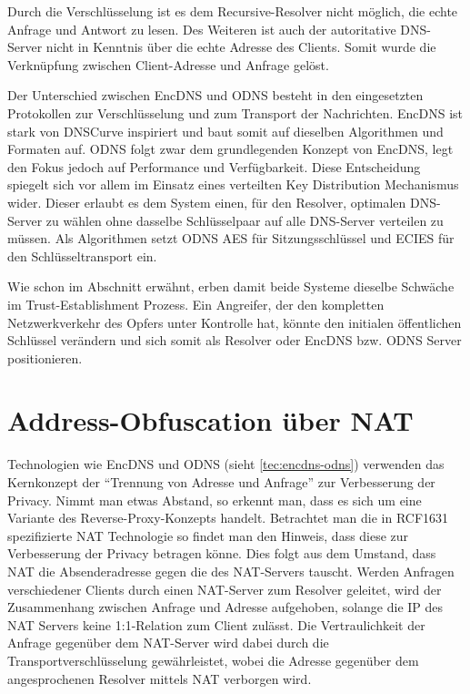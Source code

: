 Durch die Verschlüsselung ist es dem Recursive-Resolver nicht möglich, die echte Anfrage und Antwort zu lesen. Des Weiteren ist auch der autoritative DNS-Server nicht in Kenntnis über die echte Adresse des Clients. Somit wurde die Verknüpfung zwischen Client-Adresse und Anfrage gelöst.

Der Unterschied zwischen EncDNS und ODNS besteht in den eingesetzten Protokollen zur Verschlüsselung und zum Transport der Nachrichten. EncDNS ist stark von DNSCurve inspiriert und baut somit auf dieselben Algorithmen und Formaten auf. ODNS folgt zwar dem grundlegenden Konzept von EncDNS, legt den Fokus jedoch auf Performance und Verfügbarkeit. Diese Entscheidung spiegelt sich vor allem im Einsatz eines verteilten Key Distribution Mechanismus wider. Dieser erlaubt es dem System einen, für den Resolver, optimalen DNS-Server zu wählen ohne dasselbe Schlüsselpaar auf alle DNS-Server verteilen zu müssen. Als Algorithmen setzt ODNS AES für Sitzungsschlüssel und ECIES für den Schlüsseltransport ein.

Wie schon im Abschnitt  erwähnt, erben damit beide Systeme dieselbe Schwäche im Trust-Establishment Prozess. Ein Angreifer, der den kompletten Netzwerkverkehr des Opfers unter Kontrolle hat, könnte den initialen öffentlichen Schlüssel verändern und sich somit als Resolver oder EncDNS bzw. ODNS Server positionieren.

\section{Address-Obfuscation über NAT}
\label{sec:tec-nat}
Technologien wie EncDNS und \ac{ODNS} (sieht \ref{tec:encdns-odns}) verwenden das Kernkonzept der ``Trennung von Adresse und Anfrage'' zur Verbesserung der Privacy. Nimmt man etwas Abstand, so erkennt man, dass es sich um eine Variante des Reverse-Proxy-Konzepts handelt. Betrachtet man die in RCF1631 \cite{rfc1631} spezifizierte \ac{NAT} Technologie so findet man den Hinweis, dass diese zur Verbesserung der Privacy betragen könne. Dies folgt aus dem Umstand, dass NAT die Absenderadresse gegen die des NAT-Servers tauscht. Werden Anfragen verschiedener Clients durch einen NAT-Server zum Resolver geleitet, wird der Zusammenhang zwischen Anfrage und Adresse aufgehoben, solange die IP des NAT Servers keine 1:1-Relation zum Client zulässt. Die Vertraulichkeit der Anfrage gegenüber dem NAT-Server wird dabei durch die Transportverschlüsselung gewährleistet, wobei die Adresse gegenüber dem angesprochenen Resolver mittels NAT verborgen wird.

